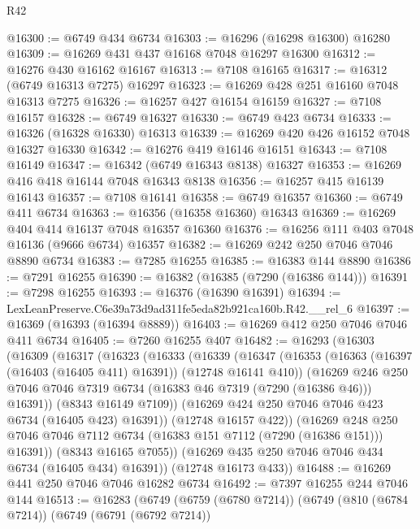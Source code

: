 \begin{lexlean}{R42}
\begin{coremodule}
{@16300 := @6749 @434 @6734
@16303 := @16296 (@16298 @16300) @16280
@16309 := @16269 @431 @437 @16168 @7048 @16297 @16300
@16312 := @16276 @430 @16162 @16167
@16313 := @7108 @16165
@16317 := @16312 (@6749 @16313 @7275) @16297
@16323 := @16269 @428 @251 @16160 @7048 @16313 @7275
@16326 := @16257 @427 @16154 @16159
@16327 := @7108 @16157
@16328 := @6749 @16327
@16330 := @6749 @423 @6734
@16333 := @16326 (@16328 @16330) @16313
@16339 := @16269 @420 @426 @16152 @7048 @16327 @16330
@16342 := @16276 @419 @16146 @16151
@16343 := @7108 @16149
@16347 := @16342 (@6749 @16343 @8138) @16327
@16353 := @16269 @416 @418 @16144 @7048 @16343 @8138
@16356 := @16257 @415 @16139 @16143
@16357 := @7108 @16141
@16358 := @6749 @16357
@16360 := @6749 @411 @6734
@16363 := @16356 (@16358 @16360) @16343
@16369 := @16269 @404 @414 @16137 @7048 @16357 @16360
@16376 := @16256 @111 @403 @7048 @16136 (@9666 @6734) @16357
@16382 := @16269 @242 @250 @7046 @7046 @8890 @6734
@16383 := @7285 @16255
@16385 := @16383 @144 @8890
@16386 := @7291 @16255
@16390 := @16382 (@16385 (@7290 (@16386 @144)))
@16391 := @7298 @16255
@16393 := @16376 (@16390 @16391)
@16394 := LexLeanPreserve.C6e39a73d9ad311fe5eda82b921ca160b.R42.__rel_6
@16397 := @16369 (@16393 (@16394 @8889))
@16403 := @16269 @412 @250 @7046 @7046 @411 @6734
@16405 := @7260 @16255 @407
@16482 := @16293
    (@16303
      (@16309
        (@16317
          (@16323
            (@16333
              (@16339
                (@16347
                  (@16353
                    (@16363 (@16397 (@16403 (@16405 @411) @16391)) (@12748 @16141 @410))
                    (@16269
                      @246
                      @250
                      @7046
                      @7046
                      @7319
                      @6734
                      (@16383 @46 @7319 (@7290 (@16386 @46)))
                      @16391))
                  (@8343 @16149 @7109))
                (@16269 @424 @250 @7046 @7046 @423 @6734 (@16405 @423) @16391))
              (@12748 @16157 @422))
            (@16269
              @248
              @250
              @7046
              @7046
              @7112
              @6734
              (@16383 @151 @7112 (@7290 (@16386 @151)))
              @16391))
          (@8343 @16165 @7055))
        (@16269 @435 @250 @7046 @7046 @434 @6734 (@16405 @434) @16391))
      (@12748 @16173 @433))
@16488 := @16269 @441 @250 @7046 @7046 @16282 @6734
@16492 := @7397 @16255 @244 @7046 @144
@16513 := @16283
    (@6749
      (@6759 (@6780 @7214))
      (@6749
        (@810 (@6784 @7214))
        (@6749
          (@6791 (@6792 @7214))
}
\end{coremodule}
\end{lexlean}
